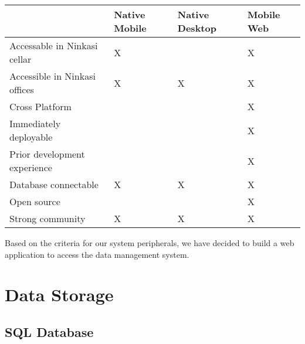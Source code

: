 \documentclass[draftclsnofoot,onecolumn,letterpaper,10pt,compsoc]{IEEEtran}
\begin{document}
        
        \begin{center}
            \begin{tabular}{ |m{14em}|m{9em}|m{9em}|m{9em}|}
                \hline
                    & Native Mobile & Native Desktop & Mobile Web \\
                
                \hline
                    Accessable in Ninkasi cellar & X & & X \\
                    
                \hline
                    Accessible in Ninkasi offices & X & X & X \\
        
                \hline
                    Cross Platform &  &  & X \\
                    
                \hline
                    Immediately deployable &  &  & X \\
                    
                \hline
                    Prior development experience &  &  & X \\
                    
                \hline
                     Database connectable & X & X & X \\
                     
                \hline
                    Open source & & & X \\
                
                \hline
                    Strong community & X & X & X \\
                
                \hline
        
            \end{tabular}
        \end{center}
    
    Based on the criteria for our system peripherals, we have decided to build a web application to access the data management system.

\section{Data Storage}
	\subsection{SQL Database}
\end{document}
